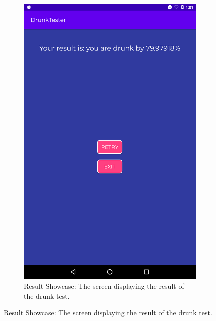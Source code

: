 \documentclass[12pt,a4paper]{article}
\begin{document}
\begin{figure}[htb!]
\begin{subfigure}[b]{0.35\textwidth}
        \includegraphics[width=\textwidth]{materials/Result_showcase.png}
        \caption*{Result Showcase: The screen displaying the result of the drunk test.}
    \end{subfigure}
\end{figure}
\end{document}
